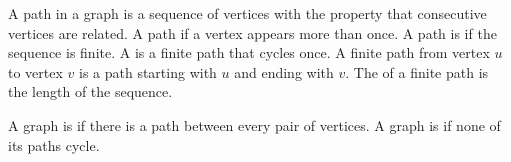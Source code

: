 

A path in a graph is a sequence of
vertices with the property that
consecutive vertices are related.
A path  if a vertex
appears more than once.
A path is  if the
sequence is finite.
A  is a finite path
that cycles once.
A finite path from vertex $u$ to vertex $v$
is a path starting with $u$ and
ending with $v$.
The  of a finite path is
the length of the sequence.


A graph is 
if there is a path between every pair
of vertices. A graph is
 if none of its
paths cycle.
\strats
